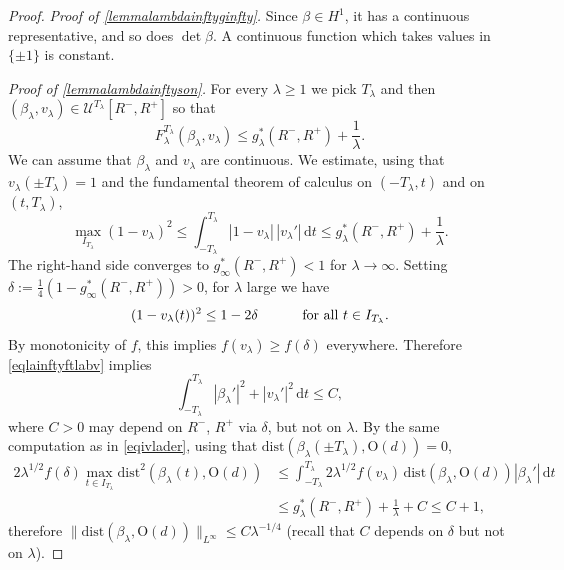 \documentclass[a4paper,reqno]{amsart}
\newcommand\calU{\mathcal{U}}
\newcommand\dist{{\mathrm{dist}}}
\newcommand\dt{{\,\mathrm{d}t}}
\theoremstyle{remark}
\newcommand{\On}{\mathrm{O}(d)}
\numberwithin{equation}{section}
\begin{document}
\begin{proof}
\emph{Proof of \ref{lemmalambdainftyginfty}.}
Since $\beta\in H^1$, it has a continuous representative, and so does $\det\beta$. A continuous function which takes values in $\{\pm1\}$ is constant.




\emph{Proof of \ref{lemmalambdainftyson}.}
For every $\lambda\ge1$ we pick $T_\lambda$ and then $(\beta_\lambda, v_\lambda)\in \calU^{T_\lambda}[R^-,R^+]$ so that
\begin{equation}\label{eqlainftyftlabv}
 F^{T_\lambda}_\lambda (\beta_\lambda,v_\lambda)\le g^*_\lambda(R^-,R^+) +\frac1\lambda.
\end{equation}
We can assume that $\beta_\lambda$ and $v_\lambda$ are continuous.
We estimate, using that $v_\lambda(\pm T_\lambda)=1$ and the fundamental theorem of calculus on $(-T_\lambda,t)$ and on $(t,T_\lambda)$,
\begin{equation}\label{eqivlader}
\max_{I_{T_\lambda}} (1-v_\lambda)^2
\le \int_{-T_\lambda}^{T_\lambda} |1-v_\lambda| \, |v_\lambda'| \dt \le
g^*_\lambda(R^-,R^+) +\frac1\lambda.
\end{equation}
The right-hand side converges to
$g^*_\infty(R^-,R^+)<1$ for $\lambda\to\infty$.
Setting $\delta:=\frac14(1-g^*_\infty(R^-,R^+))>0$, for $\lambda$ large we have
\begin{equation}\label{eqivladerris}
(1-v_\lambda(t))^2\le 1-2\delta \hskip1cm \text{ for all $t\in I_{T_\lambda}$}.
\end{equation}
By monotonicity of $f$, this implies $f(v_\lambda)\ge f(\delta)$ everywhere.
Therefore  \eqref{eqlainftyftlabv} implies
\begin{equation}\label{f:h1bounddd}
 \int_{-T_\lambda}^{T_\lambda} |\beta_\lambda'|^2 +|v_\lambda'|^2 \dt \le C,
 \end{equation}
where $C>0$ may depend on
$R^-$, $R^+$ via $\delta$, but not on $\lambda$.
 By the same computation as in \eqref{eqivlader},  
using that $\dist(\beta_\lambda(\pm T_\lambda),\On)=0$,
 \begin{equation}\label{eqivlader2}
	\begin{split}
2  \lambda^{1/2}f(\delta)\max_{t\in I_{T_\lambda}} \dist^{2}(\beta_\lambda(t), \On) &
\le \int_{-T_\lambda}^{T_\lambda}
2\lambda^{1/2} f(v_\lambda)\, \dist(\beta_\lambda, \On)|\beta_\lambda'| \dt 
\\ &
\le
g^*_\lambda(R^-,R^+) +\frac1\lambda +C \le
C+1,
\end{split}
\end{equation}
therefore $\|\dist(\beta_\lambda, \On)\|_{L^\infty}\le C \lambda^{-1/4}$ (recall that $C$ depends on $\delta$ but not on $\lambda$).


\end{proof}
\end{document}
